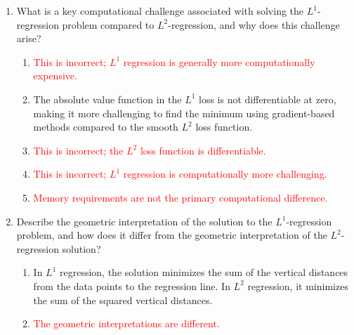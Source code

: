 \documentclass{article}%
\newcommand{\incorrect}[1]{\textcolor{red}{#1}}
\begin{document}
\begin{enumerate}
\begin{enumerate}%
\item \incorrect{This is incorrect; $L^1$ regression is less sensitive to outliers.}%
\item Because the $L^2$ loss function squares the errors, outliers have a disproportionately large influence on the model's parameters. The $L^1$ loss function, using absolute errors, is less sensitive to outliers.%
\item \incorrect{This is incorrect; $L^1$ regression is less sensitive to outliers.}%
\item \incorrect{The sensitivity difference holds regardless of dataset size.}%
\item \incorrect{The choice of loss function significantly impacts outlier sensitivity.}%
\end{enumerate}%
\vspace{1em}%
\item What is a key computational challenge associated with solving the $L^1$-regression problem compared to $L^2$-regression, and why does this challenge arise?%
\begin{enumerate}%
\item \incorrect{This is incorrect; $L^1$ regression is generally more computationally expensive.}%
\item The absolute value function in the $L^1$ loss is not differentiable at zero, making it more challenging to find the minimum using gradient-based methods compared to the smooth $L^2$ loss function.%
\item \incorrect{This is incorrect; the $L^2$ loss function is differentiable.}%
\item \incorrect{This is incorrect; $L^1$ regression is computationally more challenging.}%
\item \incorrect{Memory requirements are not the primary computational difference.}%
\end{enumerate}%
\vspace{1em}%
\item Describe the geometric interpretation of the solution to the $L^1$-regression problem, and how does it differ from the geometric interpretation of the $L^2$-regression solution?%
\begin{enumerate}%
\item In $L^1$ regression, the solution minimizes the sum of the vertical distances from the data points to the regression line. In $L^2$ regression, it minimizes the sum of the squared vertical distances.%
\item \incorrect{The geometric interpretations are different.}%

\end{enumerate}
\end{enumerate}
\end{document}
